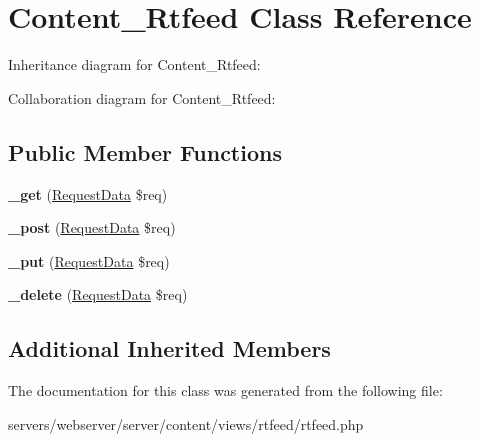 \hypertarget{class_lora_1_1_content_1_1_content___rtfeed}{}\section{Content\+\_\+\+Rtfeed Class Reference}
\label{class_lora_1_1_content_1_1_content___rtfeed}


Inheritance diagram for Content\+\_\+\+Rtfeed\+:


Collaboration diagram for Content\+\_\+\+Rtfeed\+:
\subsection*{Public Member Functions}
\begin{DoxyCompactItemize}
\item 
\mbox{\label{class_lora_1_1_content_1_1_content___rtfeed_a3ad4bf1b146a3180b34d1327ff2abf69}} 
{\bfseries \+\_\+get} (\hyperlink{class_request_data}{Request\+Data} \$req)
\item 
\mbox{\label{class_lora_1_1_content_1_1_content___rtfeed_a50751d47a139282d1c3b08cab1b6562e}} 
{\bfseries \+\_\+post} (\hyperlink{class_request_data}{Request\+Data} \$req)
\item 
\mbox{\label{class_lora_1_1_content_1_1_content___rtfeed_a2affcc8f31c13147c33450193b229194}} 
{\bfseries \+\_\+put} (\hyperlink{class_request_data}{Request\+Data} \$req)
\item 
\mbox{\label{class_lora_1_1_content_1_1_content___rtfeed_ab8ddc6de1e04524212f7d55893f78864}} 
{\bfseries \+\_\+delete} (\hyperlink{class_request_data}{Request\+Data} \$req)
\end{DoxyCompactItemize}
\subsection*{Additional Inherited Members}


The documentation for this class was generated from the following file\+:\begin{DoxyCompactItemize}
\item 
servers/webserver/server/content/views/rtfeed/rtfeed.\+php\end{DoxyCompactItemize}
